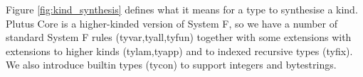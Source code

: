 \documentclass[a4paper]{article}
\newcommand{\judgmentdef}[2]{\fbox{#1}

\vspace{0.5em}

#2}
\newcommand{\ctxni}[2]{#1 \ni #2}
\newcommand{\termJ}[2]{#1 : #2}
\newcommand{\typeJ}[2]{#1 :: #2}
\begin{document}
\begin{figure}[H]
{%
%
%
%
%
%
%


}
    \label{fig:contexts}
\end{figure}

\newpage 
\noindent Figure \ref{fig:kind_synthesis} defines what
it means for a type to synthesise a kind. Plutus Core is a
higher-kinded version of System F, so we have a number of standard
System F rules (tyvar,tyall,tyfun) together with some extensions with
extensions to higher kinds (tylam,tyapp) and to indexed
recursive types (tyfix). We also introduce builtin types (tycon) to
support integers and bytestrings.

\end{document}
